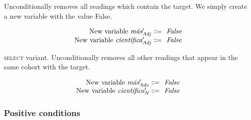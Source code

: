  Unconditionally removes all readings which contain the target. We simply create a new variable with the value False.

\begin{equation}
\centering
%
\begin{array}{r @{~\eqdef~} l}
    \text{New variable } \mas{}'_\adj         & \text{ \em False} \\
    \text{New variable } \cientifica{}'_\adj  & \text{ \em False} \\
  \end{array}
\end{equation}

 \textsc{select} variant. Unconditionally removes all other readings that appear in the same cohort with the target.

\begin{equation}
\begin{array}{r @{~\eqdef~} l}
    \text{New variable } \mas{}'_\adv      & \text{ \em False} \\
    \text{New variable } \cientifica{}'_\n & \text{ \em False} \\
\end{array}
\label{eq:slAdjOrdered}
\end{equation}



\subsubsection{Positive conditions}

\def\invConds{\text{invalid condition}}
\def\onlyTrgLeft{\text{only target left}}


